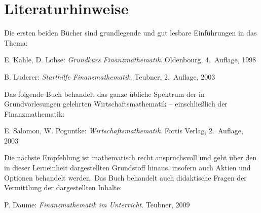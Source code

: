 \chapter*{Literaturhinweise}

Die ersten beiden Bücher sind grundlegende und gut lesbare Einführungen in das Thema:

E. Kahle, D. Lohse: \emph{Grundkurs Finanzmathematik}. Oldenbourg, 4.\ Auflage, 1998

B. Luderer: \emph{Starthilfe Finanzmathematik}. Teubner, 2.\ Auflage, 2003

\medskip
Das folgende Buch behandelt das ganze übliche Spektrum der in Grundvorlesungen gelehrten Wirtschaftsmathematik -- einschließlich der Finanzmathematik:

E. Salomon, W. Poguntke: \emph{Wirtschaftsmathematik}. Fortis Verlag, 2.\ Auflage, 2003

\medskip
Die nächste Empfehlung ist mathematisch recht anspruchsvoll und geht über den in dieser Lerneinheit dargestellten Grundstoff hinaus, insofern auch Aktien und Optionen behandelt werden. Das Buch behandelt auch didaktische Fragen der Vermittlung der dargestellten Inhalte:

P. Daume: \emph{Finanzmathematik im Unterricht}. Teubner, 2009
